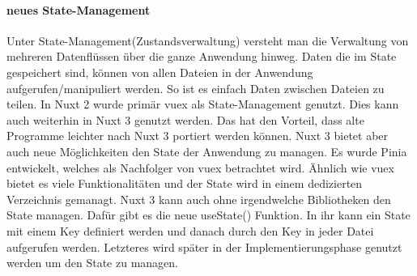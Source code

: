 \paragraph{neues State-Management}

Unter State-Management(Zustandsverwaltung) versteht man die Verwaltung von mehreren Datenflüssen über die ganze Anwendung hinweg. Daten die im State gespeichert sind, können von allen Dateien in der Anwendung aufgerufen/manipuliert werden. So ist es einfach Daten zwischen Dateien zu teilen. In Nuxt 2 wurde primär vuex als State-Management genutzt. Dies kann auch weiterhin in Nuxt 3 genutzt werden. Das hat den Vorteil, dass alte Programme leichter nach Nuxt 3 portiert werden können. Nuxt 3 bietet aber auch neue Möglichkeiten den State der Anwendung zu managen. Es wurde Pinia entwickelt, welches als Nachfolger von vuex betrachtet wird. Ähnlich wie vuex bietet es viele Funktionalitäten und der State wird in einem dedizierten Verzeichnis gemanagt. Nuxt 3 kann auch ohne irgendwelche Bibliotheken den State managen. Dafür gibt es die neue useState() Funktion. In ihr kann ein State mit einem Key definiert werden und danach durch den Key in jeder Datei aufgerufen werden. Letzteres wird später in der Implementierungsphase genutzt werden um den State zu managen.